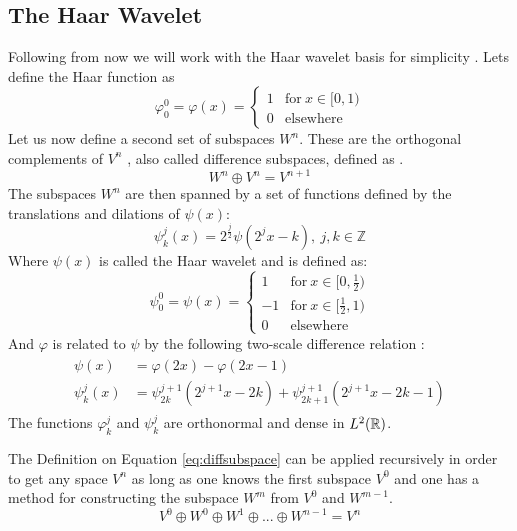 \documentclass[../master_thesis.tex]{subfiles}
\begin{document}
\subsection{The Haar Wavelet}
Following from now we will work with the Haar wavelet basis for simplicity \cite{Beylkin:MRA}.
Lets define the Haar function \cite{Schneider:2007} as
\begin{equation}
  \varphi^0_0 = \varphi(x) =
  \begin{cases}
  1 & \text{for} \ x\in [0,1)\\
  0 & \text{elsewhere}
\end{cases}
\end{equation}
Let us now define a second set of subspaces $W^n$. These are the orthogonal complements of $V^n$ \cite{Alpert1993}, also called difference subspaces,
defined as \cite{Beylkin:MRA, Sorland, Alpert1993}.
\begin{equation}
  W^n \oplus V^n = V^{n + 1} \label{eq:diffsubspace}
\end{equation}
The subspaces $W^n$ are then spanned by a set of functions defined by the translations and
dilations of $\psi(x)$:
\begin{equation}
  \psi_k^j(x) = 2^{\frac{j}{2}}\psi(2^jx - k),\  j,k \in \mathbb{Z} \label{eq:haarwavelet}
\end{equation}
Where $\psi(x)$ is called the Haar wavelet \cite{Schneider:2007} and is defined as:
\begin{equation}
  \psi^0_0 = \psi(x) =
  \begin{cases}
  1 & \text{for} \ x\in [0,\frac{1}{2})\\
  -1 & \text{for}\ x\in [\frac{1}{2}, 1)\\
  0 & \text{elsewhere}
\end{cases}
\end{equation}
And $ \varphi$ is related to $\psi$ by the following two-scale difference relation \cite{Beylkin:MRA, Schneider:2007, Sorland}:
\begin{align}
  \begin{split}\label{eq:2scalewavelet}
    \psi(x) &= \varphi(2x) - \varphi(2x - 1)\\
    \psi^j_k(x) &= \psi^{j+1}_{2k}(2^{j+1}x - 2k) + \psi^{j+1}_{2k+1}(2^{j+1}x - 2k - 1)
  \end{split}
\end{align}
The functions $\varphi^j_k$ and $\psi^j_k$ are orthonormal
and dense \cite{Beylkin:MRA, Sorland, SRJensen:2014} in $L^2(\mathbb{R})$.

The Definition on Equation \ref{eq:diffsubspace} can be applied recursively in order to
get any space $V^n$ as long as one knows the first subspace $V^0$ and one has a method for constructing the
subspace $W^m$ from $V^0$ and $W^{m-1}$.
\begin{equation}
    V^0 \oplus W^0 \oplus W^1 \oplus ... \oplus W^{n-1}  = V^n \label{eq:recursivespace}
\end{equation}
\end{document}
